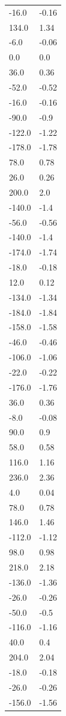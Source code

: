 \begin{longtable}{ll}
-16.0 & -0.16 \\
134.0 & 1.34 \\
-6.0 & -0.06 \\
0.0 & 0.0 \\
36.0 & 0.36 \\
-52.0 & -0.52 \\
-16.0 & -0.16 \\
-90.0 & -0.9 \\
-122.0 & -1.22 \\
-178.0 & -1.78 \\
78.0 & 0.78 \\
26.0 & 0.26 \\
200.0 & 2.0 \\
-140.0 & -1.4 \\
-56.0 & -0.56 \\
-140.0 & -1.4 \\
-174.0 & -1.74 \\
-18.0 & -0.18 \\
12.0 & 0.12 \\
-134.0 & -1.34 \\
-184.0 & -1.84 \\
-158.0 & -1.58 \\
-46.0 & -0.46 \\
-106.0 & -1.06 \\
-22.0 & -0.22 \\
-176.0 & -1.76 \\
36.0 & 0.36 \\
-8.0 & -0.08 \\
90.0 & 0.9 \\
58.0 & 0.58 \\
116.0 & 1.16 \\
236.0 & 2.36 \\
4.0 & 0.04 \\
78.0 & 0.78 \\
146.0 & 1.46 \\
-112.0 & -1.12 \\
98.0 & 0.98 \\
218.0 & 2.18 \\
-136.0 & -1.36 \\
-26.0 & -0.26 \\
-50.0 & -0.5 \\
-116.0 & -1.16 \\
40.0 & 0.4 \\
204.0 & 2.04 \\
-18.0 & -0.18 \\
-26.0 & -0.26 \\
-156.0 & -1.56 \\

\end{longtable}
